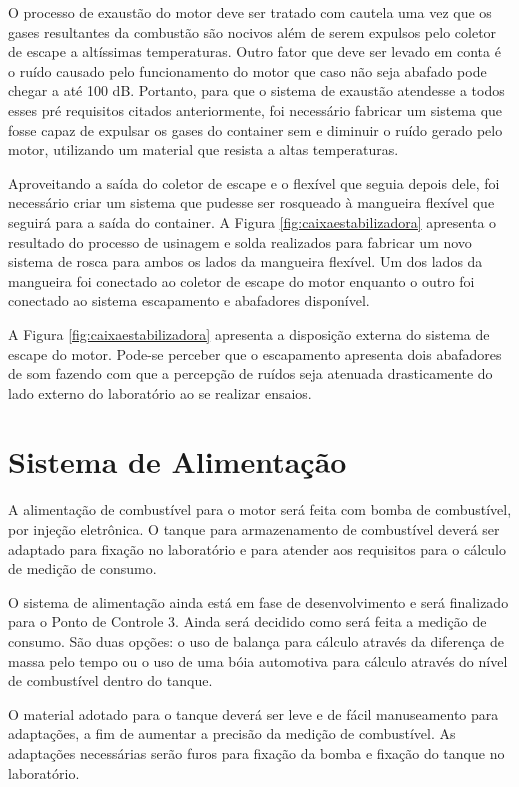 O processo de exaustão do motor deve ser tratado com cautela uma vez que os gases resultantes da combustão são nocivos além de serem expulsos pelo coletor de escape a altíssimas temperaturas. Outro fator que deve ser levado em conta é o ruído causado pelo funcionamento do motor que caso não seja abafado pode chegar a até 100 dB. Portanto, para que o sistema de exaustão atendesse a todos esses pré requisitos citados anteriormente, foi necessário fabricar um sistema que fosse capaz de expulsar os gases do container sem e diminuir o ruído gerado pelo motor, utilizando um material que resista a altas temperaturas.

Aproveitando a saída do coletor de escape e o flexível que seguia depois dele, foi necessário criar um sistema que pudesse ser rosqueado à mangueira flexível que seguirá para a saída do container. A Figura \ref{fig:caixaestabilizadora} apresenta o resultado do processo de usinagem e solda realizados para fabricar um novo sistema de rosca para ambos os lados da mangueira flexível. Um dos lados da mangueira foi conectado ao coletor de escape do motor enquanto o outro foi conectado ao sistema escapamento e abafadores disponível.

A Figura \ref{fig:caixaestabilizadora} apresenta a disposição externa do sistema de escape do motor. Pode-se perceber que o escapamento apresenta dois abafadores de som fazendo com que a percepção de ruídos seja atenuada drasticamente do lado externo do laboratório ao se realizar ensaios.


\section{Sistema de Alimentação}

A alimentação de combustível para o motor será feita com bomba de combustível, por injeção eletrônica. O tanque para armazenamento de combustível deverá ser adaptado para fixação no laboratório e para atender aos requisitos para o cálculo de medição de consumo.

O sistema de alimentação ainda está em fase de desenvolvimento e será finalizado para o Ponto de Controle 3. Ainda será decidido como será feita a medição de consumo. São duas opções: o uso de balança para cálculo através da diferença de massa pelo tempo ou o uso de uma bóia automotiva para cálculo através do nível de combustível dentro do tanque.

O material adotado para o tanque deverá ser leve e de fácil manuseamento para adaptações, a fim de aumentar a precisão da medição de combustível. As adaptações necessárias serão furos para fixação da bomba e fixação do tanque no laboratório.


